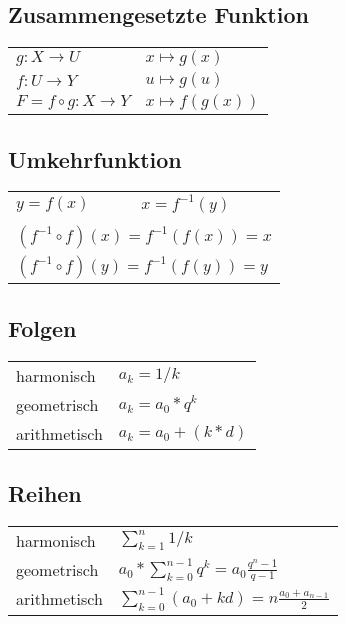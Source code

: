\subsection{Zusammengesetzte Funktion}
\begin{tabular}{ll}
    $ g: X \rightarrow U $ & $ x \mapsto g(x) $ \\
    $ f: U \rightarrow Y $ & $ u \mapsto g(u) $ \\
    $ F = f \circ g: X \rightarrow Y $ & $ x \mapsto f(g(x)) $ \\
\end{tabular} 

\subsection{Umkehrfunktion}
\begin{tabular}{ll}
    $ y = f(x) $ & $ x = f^{-1}(y) $ \\
    & \\
    \multicolumn{2}{l}{$ (f^{-1} \circ f)(x) = f^{-1}(f(x)) = x $} \\
    \multicolumn{2}{l}{$ (f^{-1} \circ f)(y) = f^{-1}(f(y)) = y $} \\
\end{tabular} 

\subsection{Folgen}
\begin{tabular}{ll}
    harmonisch & $ a_k = 1 / k $ \\
    geometrisch & $ a_k = a_0 * q^k $ \\
    arithmetisch & $ a_k = a_0 + (k*d) $ \\
\end{tabular} 

\subsection{Reihen}
\begin{tabular}{ll}
    harmonisch & $ \sum_{k=1}^n 1 / k $ \\
    geometrisch & $ a_0 * \sum_{k=0}^{n-1} q^k = a_0 \frac{q^n - 1}{q - 1}$ \\
    arithmetisch & $ \sum_{k=0}^{n-1} (a_0 + kd) = n \frac{a_0 + a_{n-1}}{2}$ \\
\end{tabular} 

